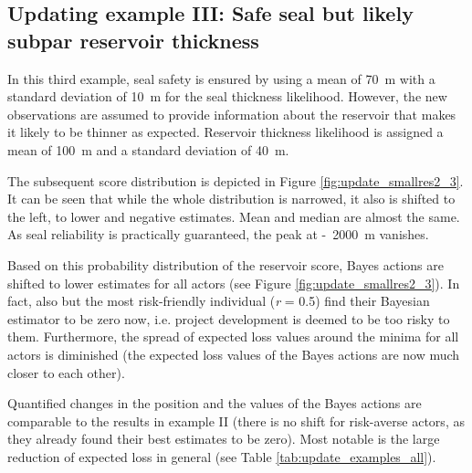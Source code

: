 	
	\subsection{Updating example III: Safe seal but likely subpar reservoir thickness}
	
	In this third example, seal safety is ensured by using a mean of 70~m with a standard deviation of 10~m for the seal thickness likelihood. However, the new observations are assumed to provide information about the reservoir that makes it likely to be thinner as expected. Reservoir thickness likelihood is assigned a mean of 100~m and a standard deviation of 40~m. 
	
	The subsequent score distribution is depicted in Figure \ref{fig:update_smallres2_3}. It can be seen that while the whole distribution is narrowed, it also is shifted to the left, to lower and negative estimates. Mean and median are almost the same. As seal reliability is practically guaranteed, the peak at -~2000~m vanishes. 
	
	Based on this probability distribution of the reservoir score, Bayes actions are shifted to lower estimates for all actors (see Figure \ref{fig:update_smallres2_3}). In fact, also but the most risk-friendly individual (\textit{r} = 0.5) find their Bayesian estimator to be zero now, i.e. project development is deemed to be too risky to them. Furthermore, the spread of expected loss values around the minima for all actors is diminished (the expected loss values of the Bayes actions are now much closer to each other).
	
	Quantified changes in the position and the values of the Bayes actions are comparable to the results in example II (there is no shift for risk-averse actors, as they already found their best estimates to be zero). Most notable is the large reduction of expected loss in general (see Table \ref{tab:update_examples_all}).	
	
